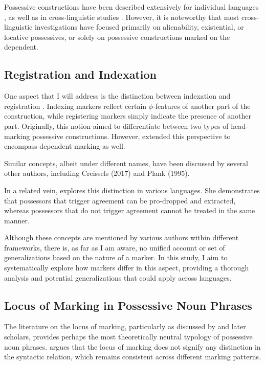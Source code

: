 Possessive constructions have been described extensively for individual languages \citep{bugenhagen1986possession,lehmann1998possession,krasnoukhova2011attributive}, as well as in cross-linguistic studies \citep{aikhenvald2013possession,nichols1986head,nichols1988alienable,croft2002typology,}. However, it is noteworthy that most cross-linguistic investigations have focused primarily on alienability, existential, or locative possessives, or solely on possessive constructions marked on the dependent.

\subsection{Registration and Indexation}
\label{sec:registration_indexation}

One aspect that I will address is the distinction between indexation and registration \citep{nichols1992linguistic}. Indexing markers reflect certain $\phi$-features of another part of the construction, while registering markers simply indicate the presence of another part. Originally, this notion aimed to differentiate between two types of head-marking possessive constructions. However, \cite{lander2020head} extended this perspective to encompass dependent marking as well.

Similar concepts, albeit under different names, have been discussed by several other authors, including Creissels (2017) and Plank (1995).

In a related vein, \cite{duguine2008structural} explores this distinction in various languages. She demonstrates that possessors that trigger agreement can be pro-dropped and extracted, whereas possessors that do not trigger agreement cannot be treated in the same manner.

Although these concepts are mentioned by various authors within different frameworks, there is, as far as I am aware, no unified account or set of generalizations based on the nature of a marker. In this study, I aim to systematically explore how markers differ in this aspect, providing a thorough analysis and potential generalizations that could apply across languages.

\subsection{Locus of Marking in Possessive Noun Phrases}

The literature on the locus of marking, particularly as discussed by \cite{nichols1986head} and later scholars, provides perhaps the most theoretically neutral typology of possessive noun phrases. \cite[57]{nichols1986head} argues that the locus of marking does not signify any distinction in the syntactic relation, which remains consistent across different marking patterns.


